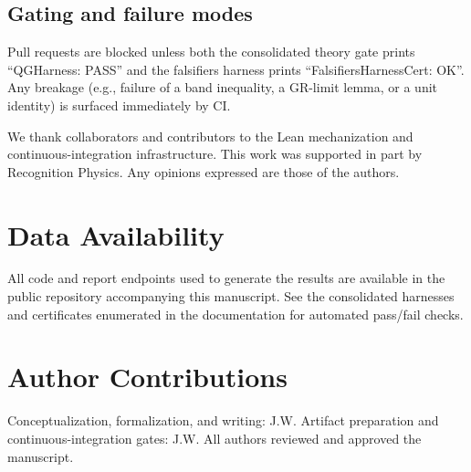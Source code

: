 \documentclass[aps,prd,twocolumn,superscriptaddress,nofootinbib,floatfix,longbibliography]{revtex4-2}
\begin{document}
\subsection{Gating and failure modes}
Pull requests are blocked unless both the consolidated theory gate prints ``QGHarness: PASS'' and the falsifiers harness prints ``FalsifiersHarnessCert: OK''. Any breakage (e.g., failure of a band inequality, a GR-limit lemma, or a unit identity) is surfaced immediately by CI.

% 
% 
% 
% 
% 
% 
% 
% 
% 
% 
% 
% 

\begin{acknowledgments}
We thank collaborators and contributors to the Lean mechanization and continuous-integration infrastructure. This work was supported in part by Recognition Physics. Any opinions expressed are those of the authors.
\end{acknowledgments}

\section*{Data Availability}
All code and report endpoints used to generate the results are available in the public repository accompanying this manuscript. See the consolidated harnesses and certificates enumerated in the documentation for automated pass/fail checks.

\section*{Author Contributions}
Conceptualization, formalization, and writing: J.W. Artifact preparation and continuous-integration gates: J.W. All authors reviewed and approved the manuscript.



\end{document}
